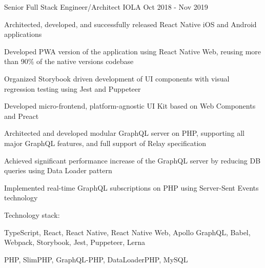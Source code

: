 \begin{cventries}
  \cventry
    {Senior Full Stack Engineer/Architect} %
    {IOLA} %
    {} %
    {Oct 2018 - Nov 2019} %
    {
      \begin{cvitems}
        \item Architected, developed, and successfully released React Native iOS and Android applications
        \item Developed PWA version of the application using React Native Web, reusing more than 90\% of the native versions codebase
        \item Organized Storybook driven development of UI components with visual regression testing using Jest and Puppeteer
        \item Developed micro-frontend, platform-agnostic UI Kit based on Web Components and Preact
        \item Architected and developed modular GraphQL server on PHP, supporting all major GraphQL features, and full support of Relay specification
        \item Achieved significant performance increase of the GraphQL server by reducing DB queries using Data Loader pattern
        \item Implemented real-time GraphQL subscriptions on PHP using Server-Sent Events technology
      \end{cvitems}
      \vspace{5mm}
      Technology stack:
      \begin{cvstackitems}
        \item TypeScript, React, React Native, React Native Web, Apollo GraphQL, Babel, Webpack, Storybook, Jest, Puppeteer, Lerna
        \item PHP, SlimPHP, GraphQL-PHP, DataLoaderPHP, MySQL
      \end{cvstackitems}
      \vspace{-2.0mm}
    }


\end{cventries}
